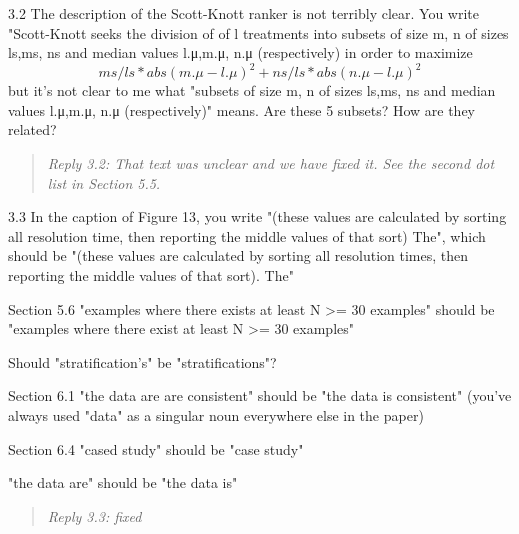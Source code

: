 \documentclass[smallcondensed]{svjour3}
\begin{document}
3.2 The description of the Scott-Knott ranker is not terribly clear. You write "Scott-Knott seeks the division of of l treatments into subsets of size m, n of sizes ls,ms, ns and median values l.μ,m.μ, n.μ (respectively) in order to maximize \[ms/ls* abs(m.μ − l.μ)^2 + ns/ls* abs(n.μ − l.μ)^2\] but it's not clear to me what "subsets of size m, n of sizes ls,ms, ns and median values l.μ,m.μ, n.μ (respectively)" means. Are these 5 subsets? How are they related?

\begin{quote}{\em 
Reply 3.2: That text was unclear and we have fixed it. See the second dot list in Section 5.5.
}\end{quote}

3.3 In the caption of Figure 13, you write "(these values are calculated by sorting all resolution time, then reporting the middle values of that sort) The", which should be "(these values are calculated by sorting all resolution times, then reporting the middle values of that sort). The"

Section 5.6
"examples where there exists at least N >= 30 examples" should be "examples where there exist at least N >= 30 examples"

Should "stratification's" be "stratifications"?

Section 6.1
"the data are are consistent" should be "the data is consistent" (you've always used "data" as a singular noun everywhere else in the paper)

Section 6.4
"cased study" should be "case study"

"the data are" should be "the data is"


\begin{quote}{\em 
Reply 3.3: fixed
}\end{quote}
\end{document}
